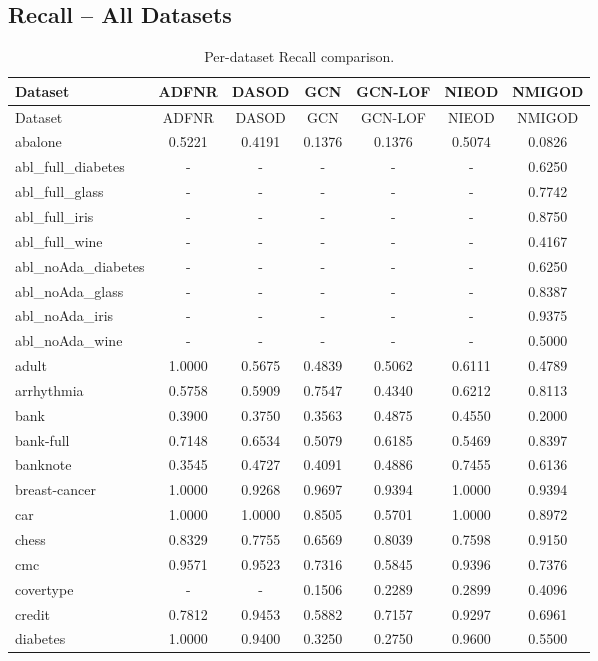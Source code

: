 \documentclass[11pt,a4paper]{article}
\begin{document}
\subsection{Recall -- All Datasets}
\begin{longtable}{lcccccc}
\caption{Per-dataset Recall comparison.}\\
\toprule Dataset & ADFNR & DASOD & GCN & GCN-LOF & NIEOD & NMIGOD \\ \midrule
\endfirsthead
\toprule Dataset & ADFNR & DASOD & GCN & GCN-LOF & NIEOD & NMIGOD \\ \midrule
\endhead
abalone & 0.5221 & 0.4191 & 0.1376 & 0.1376 & 0.5074 & 0.0826 \\
abl\_full\_diabetes & - & - & - & - & - & 0.6250 \\
abl\_full\_glass & - & - & - & - & - & 0.7742 \\
abl\_full\_iris & - & - & - & - & - & 0.8750 \\
abl\_full\_wine & - & - & - & - & - & 0.4167 \\
abl\_noAda\_diabetes & - & - & - & - & - & 0.6250 \\
abl\_noAda\_glass & - & - & - & - & - & 0.8387 \\
abl\_noAda\_iris & - & - & - & - & - & 0.9375 \\
abl\_noAda\_wine & - & - & - & - & - & 0.5000 \\
adult & 1.0000 & 0.5675 & 0.4839 & 0.5062 & 0.6111 & 0.4789 \\
arrhythmia & 0.5758 & 0.5909 & 0.7547 & 0.4340 & 0.6212 & 0.8113 \\
bank & 0.3900 & 0.3750 & 0.3563 & 0.4875 & 0.4550 & 0.2000 \\
bank-full & 0.7148 & 0.6534 & 0.5079 & 0.6185 & 0.5469 & 0.8397 \\
banknote & 0.3545 & 0.4727 & 0.4091 & 0.4886 & 0.7455 & 0.6136 \\
breast-cancer & 1.0000 & 0.9268 & 0.9697 & 0.9394 & 1.0000 & 0.9394 \\
car & 1.0000 & 1.0000 & 0.8505 & 0.5701 & 1.0000 & 0.8972 \\
chess & 0.8329 & 0.7755 & 0.6569 & 0.8039 & 0.7598 & 0.9150 \\
cmc & 0.9571 & 0.9523 & 0.7316 & 0.5845 & 0.9396 & 0.7376 \\
covertype & - & - & 0.1506 & 0.2289 & 0.2899 & 0.4096 \\
credit & 0.7812 & 0.9453 & 0.5882 & 0.7157 & 0.9297 & 0.6961 \\
diabetes & 1.0000 & 0.9400 & 0.3250 & 0.2750 & 0.9600 & 0.5500 \\

\end{longtable}
\end{document}
